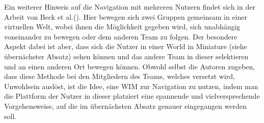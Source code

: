 Ein weiterer Hinweis auf die Navigation mit mehreren Nutzern findet sich in der Arbeit von Beck et al.(\cite{BeckImmersiveTelepresence}). Hier bewegen sich zwei Gruppen gemeinsam in einer virtuellen Welt, wobei ihnen die Möglichkeit gegeben wird, sich unabhängig voneinander zu bewegen oder dem anderen Team zu folgen. Der besondere Aspekt dabei ist aber, dass sich die Nutzer in einer World in Miniature (siehe übernächster Absatz) sehen können und das andere Team in dieser selektieren und an einen anderen Ort bewegen können. Obwohl selbst die Autoren zugeben, dass diese Methode bei den Mitgliedern des Teams, welches versetzt wird, Unwohlsein auslöst, ist die Idee, eine WIM zur Navigation zu nutzen, indem man die Plattform der Nutzer in dieser platziert eine spannende und vielversprechende Vorgehensweise, auf die im übernächsten Absatz genauer eingegangen werden soll. 



